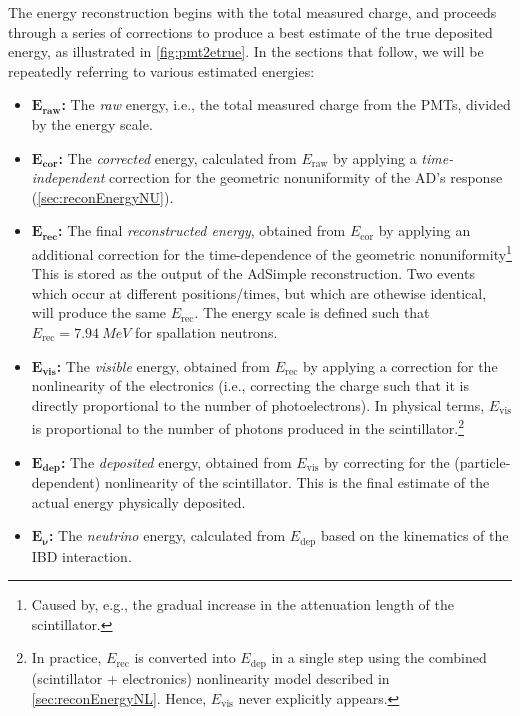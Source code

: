 \documentclass[../thesis.tex]{subfiles}
\begin{document}
The energy reconstruction begins with the total measured charge, and proceeds through a series of corrections to produce a best estimate of the true deposited energy, as illustrated in \autoref{fig:pmt2etrue}. In the sections that follow, we will be repeatedly referring to various estimated energies:
\begin{itemize}
\item $\mathbf{E_{raw}}$\textbf{:} The \emph{raw} energy, i.e., the total measured charge from the PMTs, divided by the energy scale.
\item $\mathbf{E_{cor}}$\textbf{:} The \emph{corrected} energy, calculated from $E_{\mathrm{raw}}$ by applying a \emph{time-independent} correction for the geometric nonuniformity of the AD's response (\autoref{sec:reconEnergyNU}).
\item $\mathbf{E_{rec}}$\textbf{:} The final \emph{reconstructed energy}, obtained from $E_{\mathrm{cor}}$ by applying an additional correction for the time-dependence of the geometric nonuniformity\footnote{Caused by, e.g., the gradual increase in the attenuation length of the scintillator.} This is stored as the output of the AdSimple reconstruction. Two events which occur at different positions/times, but which are othewise identical, will produce the same $E_{\mathrm{rec}}$. The energy scale is defined such that $E_{\mathrm{rec}} = \SI{7.94}{MeV}$ for spallation neutrons.
\item $\mathbf{E_{vis}}$\textbf{:} The \emph{visible} energy, obtained from $E_{\mathrm{rec}}$ by applying a correction for the nonlinearity of the electronics (i.e., correcting the charge such that it is directly proportional to the number of photoelectrons). In physical terms, $E_{\mathrm{vis}}$ is proportional to the number of photons produced in the scintillator.\footnote{In practice, $E_{\mathrm{rec}}$ is converted into $E_{\mathrm{dep}}$ in a single step using the combined (scintillator + electronics) nonlinearity model described in \autoref{sec:reconEnergyNL}. Hence, $E_{\mathrm{vis}}$ never explicitly appears.}
\item $\mathbf{E_{dep}}$\textbf{:} The \emph{deposited} energy, obtained from $E_{\mathrm{vis}}$ by correcting for the (particle-dependent) nonlinearity of the scintillator. This is the final estimate of the actual energy physically deposited.
\item $\mathbf{E_{\nu}}$\textbf{:} The \emph{neutrino} energy, calculated from $E_{\mathrm{dep}}$ based on the kinematics of the IBD interaction.
\end{itemize}
\end{document}
